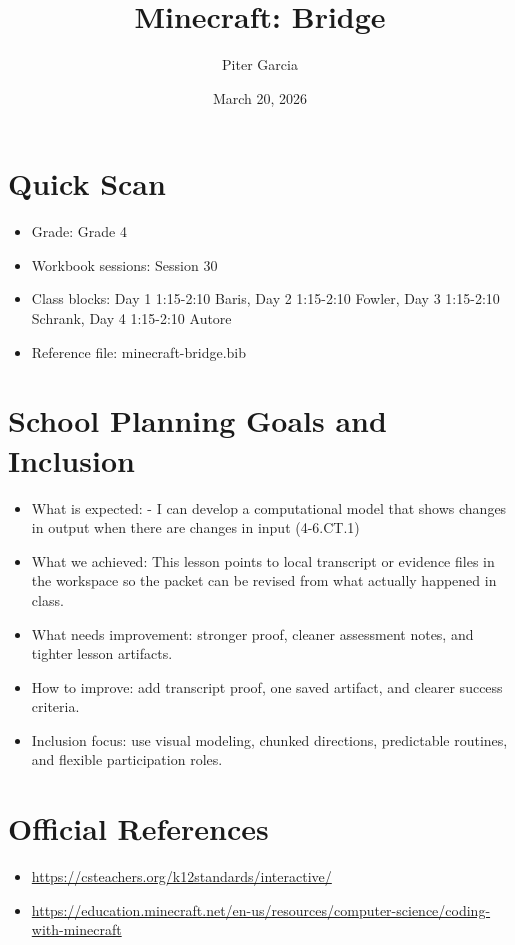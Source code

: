 \documentclass[11pt]{article}
\title{Minecraft: Bridge}
\author{Piter Garcia}
\date{March 20, 2026}
\begin{document}
    \maketitle
    \section*{Quick Scan}
    \begin{itemize}[leftmargin=*]
    \item Grade: Grade 4
    \item Workbook sessions: Session 30
    \item Class blocks: Day 1 1:15-2:10 Baris, Day 2 1:15-2:10 Fowler, Day 3 1:15-2:10 Schrank, Day 4 1:15-2:10 Autore
    \item Reference file: minecraft-bridge.bib
    \end{itemize}
    \section*{School Planning Goals and Inclusion}
    \begin{itemize}[leftmargin=*]
    \item What is expected: - I can develop a computational model that shows changes in output when there are changes in input (4-6.CT.1)
    \item What we achieved: This lesson points to local transcript or evidence files in the workspace so the packet can be revised from what actually happened in class.
    \item What needs improvement: stronger proof, cleaner assessment notes, and tighter lesson artifacts.
    \item How to improve: add transcript proof, one saved artifact, and clearer success criteria.
    \item Inclusion focus: use visual modeling, chunked directions, predictable routines, and flexible participation roles.
    \end{itemize}
    \section*{Official References}
    \begin{itemize}[leftmargin=*]
    \item \url{https://csteachers.org/k12standards/interactive/}
\item \url{https://education.minecraft.net/en-us/resources/computer-science/coding-with-minecraft}

    \end{itemize}
    
\end{document}
